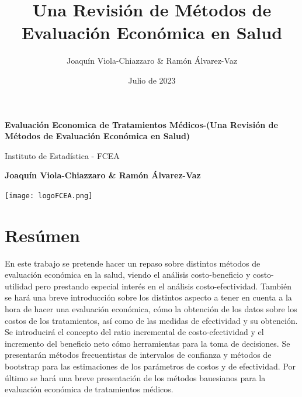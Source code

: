 \documentclass{article}
\title{Una Revisi\'on de M\'etodos de Evaluaci\'on Econ\'omica en Salud }
\author{Joaquín Viola-Chiazzaro \& Ramón Álvarez-Vaz }
\date{Julio de 2023}
\begin{document}
\begin{titlepage}
    \begin{center}
        \vspace*{3cm}
            
        \Huge
        \textbf{Evaluación Economica de Tratamientos Médicos-(Una Revisi\'on de M\'etodos de Evaluaci\'on Econ\'omica en Salud)}
            
        \vspace{1cm}
        \huge
        Instituto de Estadística - FCEA

        \vspace{1.5cm}
        \Large
            
        \textbf{Joaquín Viola-Chiazzaro \& Ramón Álvarez-Vaz}

        \vfill
        
            
        \vspace{1cm}
            
        \texttt{[image: logoFCEA.png]}
        \\
        
        \Large
        
    \end{center}
\end{titlepage}

\maketitle
\tableofcontents
\newpage

\section{Resúmen}

En este trabajo se pretende hacer un repaso sobre distintos métodos de evaluación económica en la salud, viendo el análisis costo-beneficio y costo-utilidad pero prestando especial interés en el análisis costo-efectividad.
También se hará una breve introducción sobre los distintos aspecto a tener en cuenta a la hora de hacer una evaluación económica, cómo la obtención de los datos sobre los costos de los tratamientos, así como de las medidas de efectividad y su obtención.
Se introducirá el concepto del ratio incremental de costo-efectividad y el incremento del beneficio neto cómo herramientas para la toma de decisiones.
Se presentarán métodos frecuentistas de intervalos de confianza y métodos de bootstrap para las estimaciones de los parámetros de costos y de efectividad.
Por último se hará una breve presentación de los métodos bauesianos para la evaluación económica de tratamientos médicos.
\end{document}

